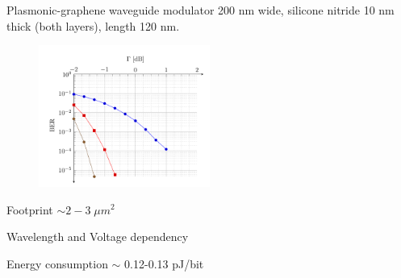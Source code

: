 \documentclass[handout,xcolor={usenames,dvipsnames},11pt]{beamer}
\begin{document}
\begin{frame}{Plasmonic-graphene waveguide modulator}
    200 nm wide, silicone nitride 10 nm thick (both layers), length 120 nm.
    \begin{figure}
        \centering
        \includegraphics[width=0.5\textwidth]{./images/BER}
    \end{figure}    
    \begin{center}
        Footprint $ \sim 2-3 \;\mu m^2$
    \end{center}
\end{frame}
\begin{frame}{Wavelength and Voltage dependency}
    \begin{figure}
        \centering
    \end{figure}
    \begin{center}
        Energy consumption $\sim$ 0.12-0.13 pJ/bit
    \end{center}
\end{frame}
\end{document}
